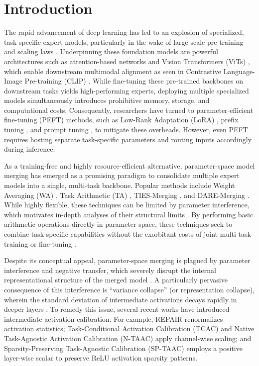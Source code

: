 \documentclass{article}
\theoremstyle{plain}
\theoremstyle{definition}
\theoremstyle{remark}
\begin{document}
\section{Introduction}
\label{sec:introduction}

The rapid advancement of deep learning has led to an explosion of specialized, task-specific expert models, particularly in the wake of large-scale pre-training and scaling laws \cite{scaling_laws}. Underpinning these foundation models are powerful architectures such as attention-based networks \cite{attention} and Vision Transformers (ViTs) \cite{vit}, which enable downstream multimodal alignment as seen in Contrastive Language-Image Pre-training (CLIP) \cite{clip}. While fine-tuning these pre-trained backbones on downstream tasks yields high-performing experts, deploying multiple specialized models simultaneously introduces prohibitive memory, storage, and computational costs. Consequently, researchers have turned to parameter-efficient fine-tuning (PEFT) methods, such as Low-Rank Adaptation (LoRA) \cite{lora}, prefix tuning \cite{prefix_tuning}, and prompt tuning \cite{prompt_tuning}, to mitigate these overheads. However, even PEFT requires hosting separate task-specific parameters and routing inputs accordingly during inference.

As a training-free and highly resource-efficient alternative, parameter-space model merging has emerged as a promising paradigm to consolidate multiple expert models into a single, multi-task backbone. Popular methods include Weight Averaging (WA) \cite{model_soup}, Task Arithmetic (TA) \cite{task_arithmetic}, TIES-Merging \cite{ties_merging}, and DARE-Merging \cite{dare}. While highly flexible, these techniques can be limited by parameter interference, which motivates in-depth analyses of their structural limits \cite{task_arithmetic_limits}. By performing basic arithmetic operations directly in parameter space, these techniques seek to combine task-specific capabilities without the exorbitant costs of joint multi-task training or fine-tuning \cite{multi_task_learning}.

Despite its conceptual appeal, parameter-space merging is plagued by parameter interference and negative transfer, which severely disrupt the internal representational structure of the merged model \cite{cross_task_interference, parameter_interference_survey}. A particularly pervasive consequence of this interference is ``variance collapse'' (or representation collapse), wherein the standard deviation of intermediate activations decays rapidly in deeper layers \cite{repair, representation_collapse}. To remedy this issue, several recent works have introduced intermediate activation calibration. For example, REPAIR \cite{repair} renormalizes activation statistics; Task-Conditional Activation Calibration (TCAC) \cite{deconstructing_cal} and Native Task-Agnostic Activation Calibration (N-TAAC) \cite{head_adaptation} apply channel-wise scaling; and Sparsity-Preserving Task-Agnostic Calibration (SP-TAAC) \cite{sp_taac} employs a positive layer-wise scalar to preserve ReLU activation sparsity patterns.
\end{document}
